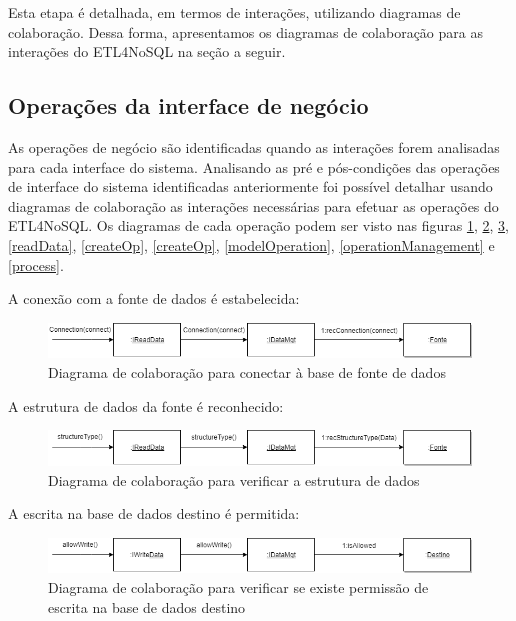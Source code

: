 Esta etapa é detalhada, em termos de interações, utilizando diagramas de colaboração. Dessa forma, apresentamos os diagramas de colaboração para as interações do ETL4NoSQL na seção a seguir.

\subsection{Operações da interface de negócio}

As operações de negócio são identificadas quando as interações forem analisadas para cada interface do sistema. Analisando as pré e pós-condições das operações de interface do sistema identificadas anteriormente foi possível detalhar usando diagramas de colaboração as interações necessárias para efetuar as operações do ETL4NoSQL. Os diagramas de cada operação podem ser visto nas figuras \ref{colaboracao1}, \ref{colaboracao2}, \ref{colaboracao3}, \ref{readData}, \ref{createOp}, \ref{createOp}, \ref{modelOperation}, \ref{operationManagement} e \ref{process}.

A conexão com a fonte de dados é estabelecida:

\begin{figure}[h]
	\centering
	\includegraphics[scale=0.5]{fig/colaboracao1.png}
	\caption{Diagrama de colaboração para conectar à base de fonte de dados}
	\label{colaboracao1}
\end{figure}

A estrutura de dados da fonte é reconhecido:

\begin{figure}[h]
	\centering
	\includegraphics[scale=0.5]{fig/colaboracao2.png}
	\caption{Diagrama de colaboração para verificar a estrutura de dados}
	\label{colaboracao2}
\end{figure}

A escrita na base de dados destino é permitida:

\begin{figure}[h]
	\centering
	\includegraphics[scale=0.5]{fig/colaboracao3.png}
	\caption{Diagrama de colaboração para verificar se existe permissão de escrita na base de dados destino}
	\label{colaboracao3}
\end{figure}

